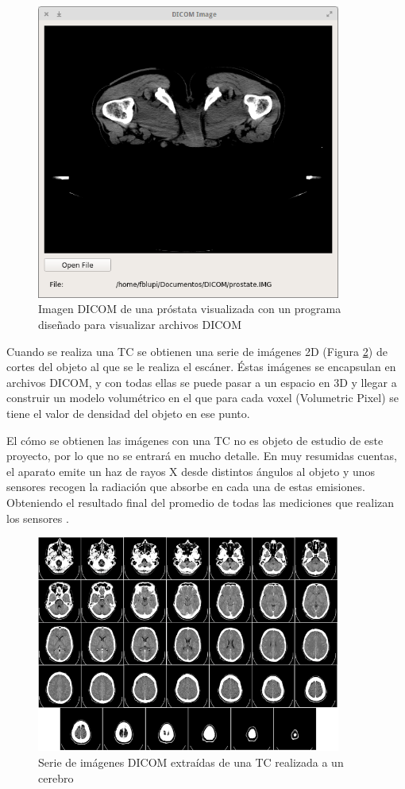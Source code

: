 \begin{figure}[H]
	\centering
	\includegraphics[width=10cm]{imagenes/prostate_dicom}
	\caption{Imagen DICOM de una próstata visualizada con un programa diseñado para visualizar archivos DICOM}
	\label{fig:prostate_dicom}
\end{figure}

Cuando se realiza una TC se obtienen una serie de imágenes 2D (Figura \ref{fig:brain_dicom_serie}) de cortes del objeto al que se le realiza el escáner. Éstas imágenes se encapsulan en archivos DICOM, y con todas ellas se puede pasar a un espacio en 3D y llegar a construir un modelo volumétrico en el que para cada voxel (Volumetric Pixel) se tiene el valor de densidad del objeto en ese punto.

El cómo se obtienen las imágenes con una TC no es objeto de estudio de este proyecto, por lo que no se entrará en mucho detalle. En muy resumidas cuentas, el aparato emite un haz de rayos X desde distintos ángulos al objeto y unos sensores recogen la radiación que absorbe en cada una de estas emisiones. Obteniendo el resultado final del promedio de todas las mediciones que realizan los sensores \cite{tac}. 

\begin{figure}[H]
	\centering
	\includegraphics[width=10cm]{imagenes/brain_dicom_serie}
	\caption{Serie de imágenes DICOM extraídas de una TC realizada a un cerebro}
	\label{fig:brain_dicom_serie}
\end{figure}

